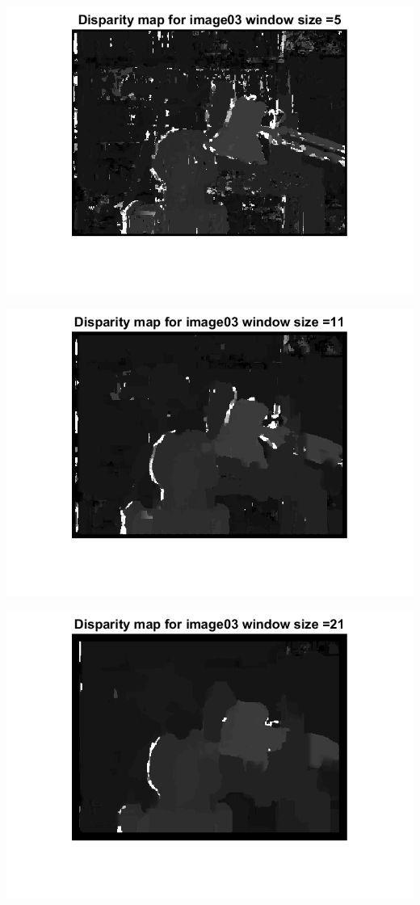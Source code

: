 \documentclass[a4paper]{iacas}
\begin{document}
\vskip 0.1in
\begin{minipage}{\linewidth}
	\includegraphics[scale=1]{results/04_16_06/disp_map_03_template_1.png}
	\label{fig_4}
\end{minipage}
\vskip 0.1in
\begin{minipage}{\linewidth}
	\includegraphics[scale=1]{results/04_16_06/disp_map_03_template_2.png}
	\label{fig_4}
\end{minipage}
\vskip 0.1in
\begin{minipage}{\linewidth}
	\includegraphics[scale=1]{results/04_16_06/disp_map_03_template_3.png}
	\label{fig_4}
\end{minipage}
\end{document}
